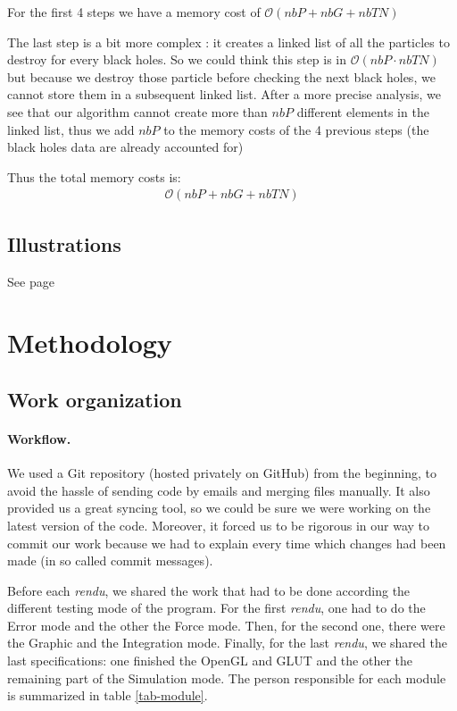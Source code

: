 \documentclass[a4paper]{article} %
\begin{document}
\begin{multicols*}{2}
For the first 4 steps we have a memory cost of $\mathcal{O}(nbP + nbG + nbTN)$

The last step is a bit more complex :
it creates a linked list of all the particles to destroy for every black holes.
So we could think this step is in $\mathcal{O}(nbP \cdot nbTN)$ but because we destroy those particle before
checking the next black holes, we cannot store them in a subsequent linked list.
After a more precise analysis, we see that our algorithm cannot create more than $nbP$ different
elements in the linked list, thus we add $nbP$ to the memory costs of the 4 previous steps
(the black holes data are already accounted for)

Thus the total memory costs is:
\begin{align}
\mathcal{O}(nbP + nbG + nbTN)
\end{align}


\subsection{Illustrations}
See page \pageref{lastpage}

\section{Methodology}
\subsection{Work organization}

\paragraph{Workflow.} We used a Git repository (hosted privately on GitHub) from the beginning,
to avoid the hassle of sending code by emails and merging files manually.
It also provided us a great syncing tool, so we could be sure we were working on
the latest version of the code.
Moreover, it forced us to be rigorous in our way to commit our work
because we had to explain every time which changes had been made
(in so called commit messages).

Before each \emph{rendu}, we shared the work that had to be done
according the different testing mode of the program.
For the first \emph{rendu}, one had to do the Error mode and the other the Force mode.
Then, for the second one, there were the Graphic and the Integration mode.
Finally, for the last \emph{rendu}, we shared the last specifications:
one finished the OpenGL and GLUT
and the other the remaining part of the Simulation mode.
The person responsible for each module is summarized in table \ref{tab-module}.


\end{multicols*}
\end{document}
